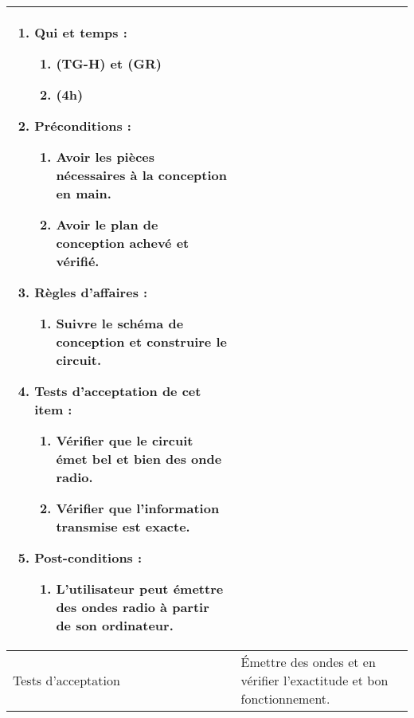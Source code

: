 \begin{longtable}{|l|p{}|}
\begin{enumerate}[label*=\arabic*.]
                \begin{enumerate}[label*=\arabic*.]
                    \item Qui et temps :
                    \begin{enumerate}[label*=\arabic*.]
                        \item (TG-H) et (GR)
                        \item (4h)
                    \end{enumerate}
                    \item Préconditions : 
                    \begin{enumerate}[label*=\arabic*.]
                        \item Avoir les pièces nécessaires à la conception en main.
                        \item Avoir le plan de conception achevé et vérifié.
                    \end{enumerate}
                    \item Règles d’affaires :
                    \begin{enumerate}[label*=\arabic*.]
                        \item Suivre le schéma de conception et construire le circuit.
                    \end{enumerate}
                    \item Tests d'acceptation de cet item :
                    \begin{enumerate}[label*=\arabic*.]
                        \item Vérifier que le circuit émet bel et bien des onde radio.
                        \item Vérifier que l'information transmise est exacte.
                    \end{enumerate}
                    \item Post-conditions :
                    \begin{enumerate}[label*=\arabic*.]
                        \item L'utilisateur peut émettre des ondes radio à partir de son ordinateur.
                    \end{enumerate}
                \end{enumerate}
        \end{enumerate} \\
\hline
    Tests d'acceptation & Émettre des ondes et en vérifier l'exactitude et bon fonctionnement. \\


\end{longtable}
